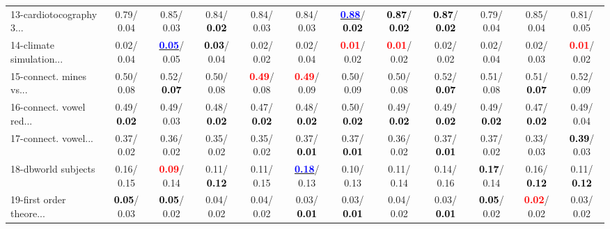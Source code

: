 \begin{table}[h]
\begin{center}
{\begin{tabular}{lc|c|c|c|c|c|c|c|c|c|c}
13-cardiotocography 3... &   0.79/  0.04 &   0.85/  0.03 &   0.84/\textcolor{black}{\textbf{  0.02}} &   0.84/  0.03 &   0.84/  0.03 & \underline{\textcolor{blue}{\textbf{  0.88}}}/\textcolor{black}{\textbf{  0.02}} & \textcolor{black}{\textbf{  0.87}}/\textcolor{black}{\textbf{  0.02}} & \textcolor{black}{\textbf{  0.87}}/\textcolor{black}{\textbf{  0.02}} &   0.79/  0.04 &   0.85/  0.04 &   0.81/  0.05 \\
14-climate simulation... &   0.02/  0.04 & \underline{\textcolor{blue}{\textbf{  0.05}}}/  0.05 & \textcolor{black}{\textbf{  0.03}}/  0.04 &   0.02/  0.02 &   0.02/  0.04 & \textcolor{red}{\textbf{  0.01}}/  0.02 & \textcolor{red}{\textbf{  0.01}}/  0.02 &   0.02/  0.02 &   0.02/  0.04 &   0.02/  0.03 & \textcolor{red}{\textbf{  0.01}}/  0.02 \\ \hline
15-connect. mines vs... &   0.50/  0.08 &   0.52/\textcolor{black}{\textbf{  0.07}} &   0.50/  0.08 & \textcolor{red}{\textbf{  0.49}}/  0.08 & \textcolor{red}{\textbf{  0.49}}/  0.09 &   0.50/  0.09 &   0.50/  0.08 &   0.52/\textcolor{black}{\textbf{  0.07}} &   0.51/  0.08 &   0.51/\textcolor{black}{\textbf{  0.07}} &   0.52/  0.09 \\
16-connect. vowel red... &   0.49/\textcolor{black}{\textbf{  0.02}} &   0.49/  0.03 &   0.48/\textcolor{black}{\textbf{  0.02}} &   0.47/\textcolor{black}{\textbf{  0.02}} &   0.48/\textcolor{black}{\textbf{  0.02}} &   0.50/\textcolor{black}{\textbf{  0.02}} &   0.49/\textcolor{black}{\textbf{  0.02}} &   0.49/\textcolor{black}{\textbf{  0.02}} &   0.49/\textcolor{black}{\textbf{  0.02}} &   0.47/\textcolor{black}{\textbf{  0.02}} &   0.49/  0.04 \\
17-connect. vowel... &   0.37/  0.02 &   0.36/  0.02 &   0.35/  0.02 &   0.35/  0.02 &   0.37/\textcolor{black}{\textbf{  0.01}} &   0.37/\textcolor{black}{\textbf{  0.01}} &   0.36/  0.02 &   0.37/\textcolor{black}{\textbf{  0.01}} &   0.37/  0.02 &   0.33/  0.03 & \textcolor{black}{\textbf{  0.39}}/  0.03 \\
18-dbworld subjects &   0.16/  0.15 & \textcolor{red}{\textbf{  0.09}}/  0.14 &   0.11/\textcolor{black}{\textbf{  0.12}} &   0.11/  0.15 & \underline{\textcolor{blue}{\textbf{  0.18}}}/  0.13 &   0.10/  0.13 &   0.11/  0.14 &   0.14/  0.16 & \textcolor{black}{\textbf{  0.17}}/  0.14 &   0.16/\textcolor{black}{\textbf{  0.12}} &   0.11/\textcolor{black}{\textbf{  0.12}} \\
19-first order theore... & \textcolor{black}{\textbf{  0.05}}/  0.03 & \textcolor{black}{\textbf{  0.05}}/  0.02 &   0.04/  0.02 &   0.04/  0.02 &   0.03/\textcolor{black}{\textbf{  0.01}} &   0.03/\textcolor{black}{\textbf{  0.01}} &   0.04/  0.02 &   0.03/\textcolor{black}{\textbf{  0.01}} & \textcolor{black}{\textbf{  0.05}}/  0.02 & \textcolor{red}{\textbf{  0.02}}/  0.02 &   0.03/  0.02 \\

\end{tabular}}
\end{center}
\end{table}
